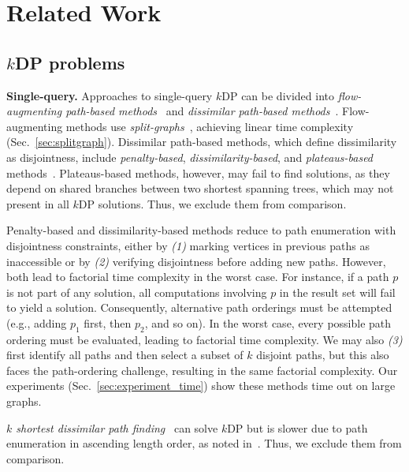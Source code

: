 \section{Related Work}
\label{sec:relatedwork}

\subsection{$k$DP problems}\label{sec:related_kdp}
\textbf{Single-query.} 
Approaches to single-query $k$DP can be divided into \emph{flow-augmenting path-based methods}~\cite{baseline_moreverbose, baselineOnlySplitP1, baseline1step2} and \emph{dissimilar path-based methods}~\cite{Penalty, dissimilarity_topk1, SCB}.
Flow-augmenting methods use \emph{split-graphs}~\cite{baseline_moreverbose, baseline1step2}, achieving linear time complexity (Sec.~\ref{sec:splitgraph}).
Dissimilar path-based methods, which define dissimilarity as disjointness, include \emph{penalty-based}, \emph{dissimilarity-based}, and \emph{plateaus-based} methods~\cite{Penalty, SCB}.
Plateaus-based methods, however, may fail to find solutions, as they depend on shared branches between two shortest spanning trees, which may not present in all $k$DP solutions. Thus, we exclude them from comparison.

Penalty-based and dissimilarity-based methods reduce to path enumeration with disjointness constraints, either by \emph{(1)} marking vertices in previous paths as inaccessible or by \emph{(2)}  verifying disjointness before adding new paths. However, both lead to factorial time complexity in the worst case.
For instance, if a path $p$ is not part of any solution, all computations involving $p$ in the result set will fail to yield a solution. 
    Consequently, alternative path orderings must be attempted (e.g., adding $p_1$ first, then $p_2$, and so on).
    In the worst case, every possible path ordering must be evaluated, leading to factorial time complexity.
We may also \emph{(3)} first identify all paths and then select a subset of $k$ disjoint paths, 
    but this also faces the path-ordering challenge, resulting in the same factorial complexity.
Our experiments (Sec.~\ref{sec:experiment_time}) show these methods time out on large graphs.

\emph{$k$ shortest dissimilar path finding}~\cite{dissimilarity_topk1} can solve $k$DP but is slower due to path enumeration in ascending length order, as noted in~\cite{SCB}. Thus, we exclude them from comparison.

